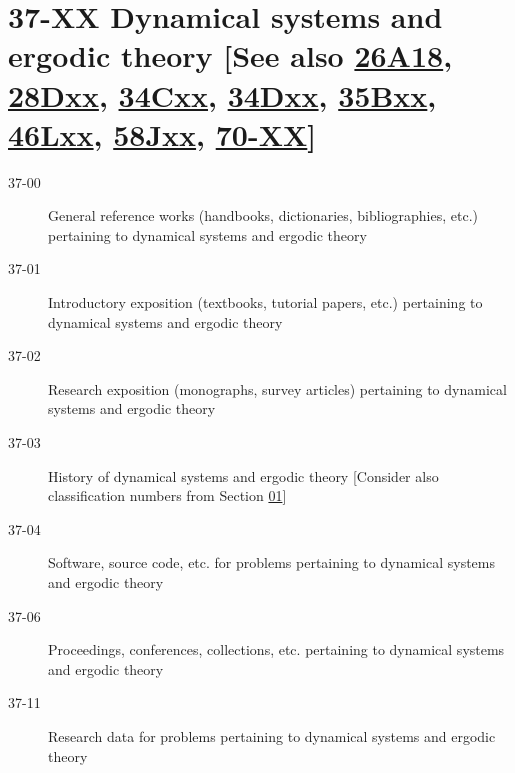 \documentclass[letterpaper]{article}
\begin{document}
\section*{37-XX Dynamical systems and ergodic theory [See also \hyperref[26A18]{26A18}, \hyperref[28Dxx]{28Dxx}, \hyperref[34Cxx]{34Cxx}, \hyperref[34Dxx]{34Dxx}, \hyperref[35Bxx]{35Bxx}, \hyperref[46Lxx]{46Lxx}, \hyperref[58Jxx]{58Jxx}, \hyperref[70-XX]{70-XX}] }\label{37-XX}
\begin{description}
\item [37-00]\label{37-00} General reference works (handbooks, dictionaries, bibliographies, etc.) pertaining to dynamical systems and ergodic theory
\item [37-01]\label{37-01} Introductory exposition (textbooks, tutorial papers, etc.) pertaining to dynamical systems and ergodic theory
\item [37-02]\label{37-02} Research exposition (monographs, survey articles) pertaining to dynamical systems and ergodic theory
\item [37-03]\label{37-03} History of dynamical systems and ergodic theory [Consider also classification numbers from Section \hyperref[01-XX]{01}]
\item [37-04]\label{37-04} Software, source code, etc. for problems pertaining to dynamical systems and ergodic theory
\item [37-06]\label{37-06} Proceedings, conferences, collections, etc. pertaining to dynamical systems and ergodic theory
\item [37-11]\label{37-11} Research data for problems pertaining to dynamical systems and ergodic theory
\end{description}
\end{document}
